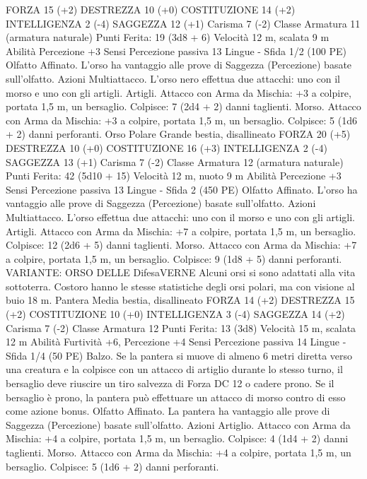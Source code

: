 \begin{multicols}{2}
FORZA 15 (+2)
DESTREZZA 10 (+0)
COSTITUZIONE 14 (+2)
INTELLIGENZA 2 (-4)
SAGGEZZA 12 (+1)
Carisma 7 (-2)
Classe Armatura 11 (armatura naturale)
\hspace*{0pt}\hfill{Punti Ferita}: 19 (3d8 + 6)
Velocità 12 m, scalata 9 m
Abilità Percezione +3
Sensi Percezione passiva 13
Lingue -
Sfida 1/2 (100 PE)
Olfatto Affinato. L’orso ha vantaggio alle prove di Saggezza
(Percezione) basate sull’olfatto.
Azioni
Multiattacco. L’orso nero effettua due attacchi: uno con il morso
e uno con gli artigli.
Artigli. Attacco con Arma da Mischia: +3 a colpire, portata 1,5
m, un bersaglio.
Colpisce: 7 (2d4 + 2) danni taglienti.
Morso. Attacco con Arma da Mischia: +3 a colpire, portata 1,5
m, un bersaglio.
Colpisce: 5 (1d6 + 2) danni perforanti.
Orso Polare
Grande bestia, disallineato
FORZA 20 (+5)
DESTREZZA 10 (+0)
COSTITUZIONE 16 (+3)
INTELLIGENZA 2 (-4)
SAGGEZZA 13 (+1)
Carisma 7 (-2)
Classe Armatura 12 (armatura naturale)
\hspace*{0pt}\hfill{Punti Ferita}: 42 (5d10 + 15)
Velocità 12 m, nuoto 9 m
Abilità Percezione +3
Sensi Percezione passiva 13
Lingue -
Sfida 2 (450 PE)
Olfatto Affinato. L’orso ha vantaggio alle prove di Saggezza
(Percezione) basate sull’olfatto.
Azioni
Multiattacco. L’orso effettua due attacchi: uno con il morso e
uno con gli artigli.
Artigli. Attacco con Arma da Mischia: +7 a colpire, portata 1,5
m, un bersaglio.
Colpisce: 12 (2d6 + 5) danni taglienti.
Morso. Attacco con Arma da Mischia: +7 a colpire, portata 1,5
m, un bersaglio.
Colpisce: 9 (1d8 + 5) danni perforanti.
VARIANTE: ORSO DELLE DifesaVERNE
Alcuni orsi si sono adattati alla vita sottoterra. Costoro hanno le
stesse statistiche degli orsi polari, ma con visione al buio 18 m.
Pantera
Media bestia, disallineato
FORZA 14 (+2)
DESTREZZA 15 (+2)
COSTITUZIONE 10 (+0)
INTELLIGENZA 3 (-4)
SAGGEZZA 14 (+2)
Carisma 7 (-2)
Classe Armatura 12
\hspace*{0pt}\hfill{Punti Ferita}: 13 (3d8)
Velocità 15 m, scalata 12 m
Abilità Furtività +6, Percezione +4
Sensi Percezione passiva 14
Lingue -
Sfida 1/4 (50 PE)
Balzo. Se la pantera si muove di almeno 6 metri diretta verso una
creatura e la colpisce con un attacco di artiglio durante lo stesso
turno, il bersaglio deve riuscire un tiro salvezza di Forza DC 12 o
cadere prono. Se il bersaglio è prono, la pantera può effettuare un
attacco di morso contro di esso come azione bonus.
Olfatto Affinato. La pantera ha vantaggio alle prove di Saggezza
(Percezione) basate sull’olfatto.
Azioni
Artiglio. Attacco con Arma da Mischia: +4 a colpire, portata 1,5
m, un bersaglio.
Colpisce: 4 (1d4 + 2) danni taglienti.
Morso. Attacco con Arma da Mischia: +4 a colpire, portata 1,5
m, un bersaglio.
Colpisce: 5 (1d6 + 2) danni perforanti.
 

\end{multicols}

